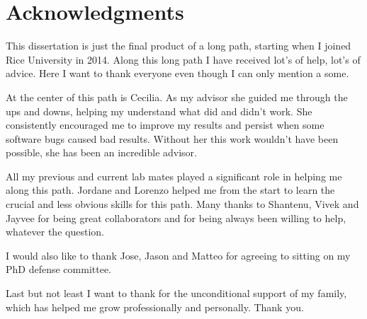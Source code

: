\chapter*{Acknowledgments}


This dissertation is just the final product of a long path, starting when I joined Rice University in 2014.
Along this long path I have received lot's of help, lot's of advice. Here I want to thank everyone even though 
I can only mention a some.

At the center of this path is Cecilia. As my advisor she guided me through the ups and downs, helping my understand what did and didn't work. 
She consistently encouraged me to improve my results and persist when some software bugs caused bad results. Without her this work wouldn't have been possible, she has been an incredible advisor. 

All my previous and current lab mates played a significant role in helping me along this path. Jordane and Lorenzo helped me from the start to learn the crucial and less obvious skills for this path. Many thanks to Shantenu, Vivek and Jayvee for being great collaborators and for being always been willing to help, whatever the question.


I would also like to thank Jose, Jason and Matteo for agreeing to sitting on my PhD defense
committee.

Last but not least I want to thank for the unconditional support of my family, which has helped me grow professionally
and personally. Thank you.
